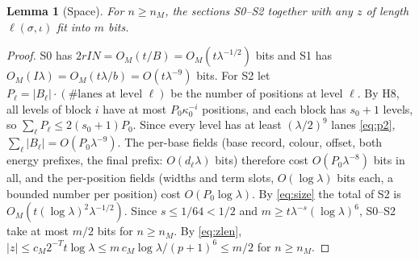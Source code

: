 \documentclass[11pt]{article}
\newtheorem{lemma}[theorem]{Lemma}
\theoremstyle{definition}
\theoremstyle{remark}
\begin{document}
\begin{lemma}[Space]\label{lem:space}
For $n\ge n_M$, the sections S0--S2 together with any $z$ of length $\ell(\sigma,\iota)$ fit into $m$ bits.
\end{lemma}
\begin{proof}
S0 has $2rIN=O_M(t/B)=O_M(t\lambda^{-1/2})$ bits and S1 has $O_M(I\lambda)=O_M(t\lambda/b)=O(t\lambda^{-9})$ bits. For S2 let
$P_\ell=|B_\ell|\cdot(\#\text{lanes at level }\ell)$ be the number of positions at level $\ell$. By H8, all levels of block $i$
have at most $P_0\kappa_0^{-i}$ positions, and each block has $s_0+1$ levels, so $\sum_\ell P_\ell\le2(s_0+1)P_0$. Since every level
has at least $(\lambda/2)^9$ lanes \eqref{eq:p2}, $\sum_\ell|B_\ell|=O(P_0\lambda^{-9})$. The per-base fields (base record, colour,
offset, both energy prefixes, the final prefix: $O(d_\ell\lambda)$ bits) therefore cost $O(P_0\lambda^{-8})$ bits in all, and the
per-position fields (widths and term slots, $O(\log\lambda)$ bits each, a bounded number per position) cost $O(P_0\log\lambda)$.
By \eqref{eq:size} the total of S2 is $O_M(t(\log\lambda)^2\lambda^{-1/2})$. Since $s\le1/64<1/2$ and
$m\ge t\lambda^{-s}(\log\lambda)^6$, S0--S2 take at most $m/2$ bits for $n\ge n_M$. By \eqref{eq:zlen},
$|z|\le c_M2^{-T}t\log\lambda\le m\,c_M\log\lambda/(p+1)^6\le m/2$ for $n\ge n_M$.
\end{proof}
\end{document}
